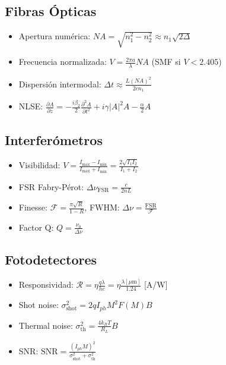 \documentclass[11pt,a4paper]{article}
\begin{document}
\subsection{Fibras Ópticas}

\begin{itemize}
    \item Apertura numérica: $NA = \sqrt{n_1^2 - n_2^2} \approx n_1\sqrt{2\Delta}$
    \item Frecuencia normalizada: $V = \frac{2\pi a}{\lambda}NA$ (SMF si $V < 2.405$)
    \item Dispersión intermodal: $\Delta t \approx \frac{L(NA)^2}{2cn_1}$
    \item NLSE: $\frac{\partial A}{\partial z} = -\frac{i\beta_2}{2}\frac{\partial^2 A}{\partial t^2} + i\gamma|A|^2A - \frac{\alpha}{2}A$
\end{itemize}

\subsection{Interferómetros}

\begin{itemize}
    \item Visibilidad: $V = \frac{I_{\max} - I_{\min}}{I_{\max} + I_{\min}} = \frac{2\sqrt{I_1I_2}}{I_1 + I_2}$
    \item FSR Fabry-Pérot: $\Delta\nu_{\text{FSR}} = \frac{c}{2nL}$
    \item Finesse: $\mathcal{F} = \frac{\pi\sqrt{R}}{1-R}$, FWHM: $\Delta\nu = \frac{\text{FSR}}{\mathcal{F}}$
    \item Factor Q: $Q = \frac{\nu_0}{\Delta\nu}$
\end{itemize}

\subsection{Fotodetectores}

\begin{itemize}
    \item Responsividad: $\mathcal{R} = \eta\frac{q\lambda}{hc} = \eta\frac{\lambda[\mu\text{m}]}{1.24}$ [A/W]
    \item Shot noise: $\sigma_{\text{shot}}^2 = 2qI_{ph}M^2F(M)B$
    \item Thermal noise: $\sigma_{\text{th}}^2 = \frac{4k_BT}{R_L}B$
    \item SNR: $\text{SNR} = \frac{(I_{ph}M)^2}{\sigma_{\text{shot}}^2 + \sigma_{\text{th}}^2}$
\end{itemize}
\end{document}
